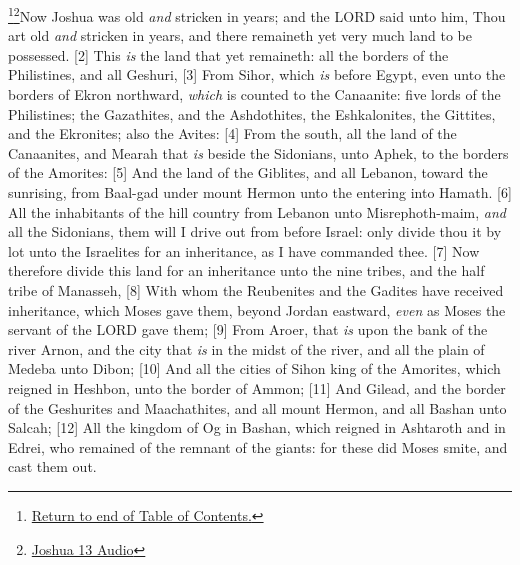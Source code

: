 \footnote{\textcolor[rgb]{0.00,0.25,0.00}{\hyperlink{TOC}{Return to end of Table of Contents.}}}\footnote{\href{https://audiobible.com/bible/joshua_13.html}{\textcolor[cmyk]{0.99998,1,0,0}{Joshua 13 Audio}}}\textcolor[cmyk]{0.99998,1,0,0}{Now Joshua was old \emph{and} stricken in years; and the LORD said unto him, Thou art old \emph{and} stricken in years, and there remaineth yet very much land to be possessed.}
[2] \textcolor[cmyk]{0.99998,1,0,0}{This \emph{is} the land that yet remaineth: all the borders of the Philistines, and all Geshuri,}
[3] \textcolor[cmyk]{0.99998,1,0,0}{From Sihor, which \emph{is} before Egypt, even unto the borders of Ekron northward, \emph{which} is counted to the Canaanite: five lords of the Philistines; the Gazathites, and the Ashdothites, the Eshkalonites, the Gittites, and the Ekronites; also the Avites:}
[4] \textcolor[cmyk]{0.99998,1,0,0}{From the south, all the land of the Canaanites, and Mearah that \emph{is} beside the Sidonians, unto Aphek, to the borders of the Amorites:}
[5] \textcolor[cmyk]{0.99998,1,0,0}{And the land of the Giblites, and all Lebanon, toward the sunrising, from Baal-gad under mount Hermon unto the entering into Hamath.}
[6] \textcolor[cmyk]{0.99998,1,0,0}{All the inhabitants of the hill country from Lebanon unto Misrephoth-maim, \emph{and} all the Sidonians, them will I drive out from before   Israel: only divide thou it by lot unto the Israelites for an inheritance, as I have commanded thee.}
[7] \textcolor[cmyk]{0.99998,1,0,0}{Now therefore divide this land for an inheritance unto the nine tribes, and the half tribe of Manasseh,}
[8] \textcolor[cmyk]{0.99998,1,0,0}{With whom the Reubenites and the Gadites have received   inheritance, which Moses gave them, beyond Jordan eastward, \emph{even} as Moses the servant of the LORD gave them;}
[9] \textcolor[cmyk]{0.99998,1,0,0}{From Aroer, that \emph{is} upon the bank of the river Arnon, and the city that \emph{is} in the midst of the river, and all the plain of Medeba unto Dibon;}
[10] \textcolor[cmyk]{0.99998,1,0,0}{And all the cities of Sihon king of the Amorites, which reigned in Heshbon, unto the border of   Ammon;}
[11] \textcolor[cmyk]{0.99998,1,0,0}{And Gilead, and the border of the Geshurites and Maachathites, and all mount Hermon, and all Bashan unto Salcah;}
[12] \textcolor[cmyk]{0.99998,1,0,0}{All the kingdom of Og in Bashan, which reigned in Ashtaroth and in Edrei, who remained of the remnant of the giants: for these did Moses smite, and cast them out.}
